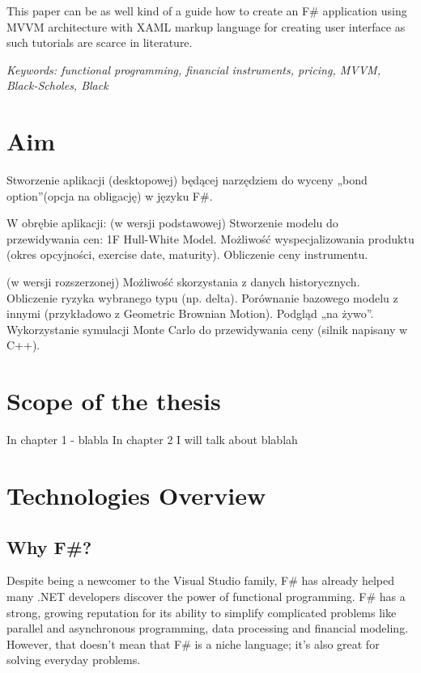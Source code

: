     This paper can be as well kind of a guide how to create an F\# application using MVVM architecture with XAML markup language for creating user interface as such tutorials are scarce in literature.
    
    \emph{Keywords: functional programming, financial instruments, pricing, MVVM, Black-Scholes, Black}






\section{Aim}
    Stworzenie aplikacji (desktopowej) będącej narzędziem do wyceny „bond option”(opcja na obligację) w języku F\#.
    
    W obrębie aplikacji: 
    (w wersji podstawowej)
    Stworzenie modelu do przewidywania cen: 1F Hull-White Model.
    Możliwość wyspecjalizowania produktu (okres opcyjności, exercise date, maturity).
    Obliczenie ceny instrumentu.
    
    (w wersji rozszerzonej)
    Możliwość skorzystania z danych historycznych.
    Obliczenie ryzyka wybranego typu (np. delta).
    Porównanie bazowego modelu z innymi (przykładowo z Geometric Brownian Motion).
    Podgląd „na żywo”.
    Wykorzystanie symulacji Monte Carlo do przewidywania ceny (silnik napisany w C++).

\section{Scope of the thesis}
    In chapter 1 - blabla
    In chapter 2 I will talk about blablah




\section{Technologies Overview}
\subsection{Why F\#?}
    Despite being a newcomer to the Visual Studio family, F\# has already helped many .NET developers discover the power of functional programming. F\# has a strong, growing reputation for its ability to simplify complicated problems like parallel and asynchronous programming, data processing and financial modeling. However, that doesn’t mean that F\# is a niche language; it’s also great for solving everyday problems.
    
